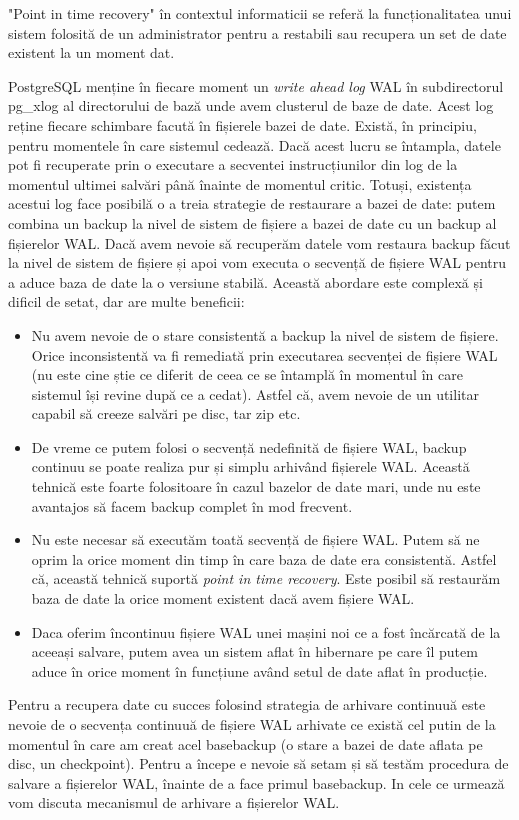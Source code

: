 "Point in time recovery" în contextul informaticii se referă la funcționalitatea unui sistem folosită de un administrator pentru a restabili sau recupera un set de date existent la un moment dat.
\par
PostgreSQL menține în fiecare moment un \textit{write ahead log} WAL în subdirectorul pg_xlog al directorului de bază unde avem clusterul de baze de date. Acest log reține fiecare schimbare facută în fișierele bazei de date. Există, în principiu, pentru momentele în care sistemul cedează. Dacă acest lucru se întampla, datele pot fi recuperate prin o executare a secventei instrucțiunilor din log de la momentul ultimei salvări până înainte de momentul critic. Totuși, existența acestui log face posibilă o a treia strategie de restaurare a bazei de date: putem combina un backup la nivel de sistem de fișiere a bazei de date cu un backup al fișierelor WAL. Dacă avem nevoie să recuperăm datele vom restaura backup făcut la nivel de sistem de fișiere și apoi vom executa o secvență de fișiere WAL pentru a aduce baza de date la o versiune stabilă. Această abordare este complexă și dificil de setat, dar are multe beneficii:
\begin{itemize}
\item Nu avem nevoie de o stare consistentă a backup la nivel de sistem de fișiere. Orice inconsistentă va fi remediată prin executarea secvenței de fișiere WAL (nu este cine știe ce diferit de ceea ce se întamplă în momentul în care sistemul își revine după ce a cedat). Astfel că, avem nevoie de un utilitar capabil să creeze salvări pe disc, tar zip etc.
\item De vreme ce putem folosi o secvență nedefinită de fișiere WAL, backup continuu se poate realiza pur și simplu arhivând fișierele WAL. Această tehnică este foarte folositoare în cazul bazelor de date mari, unde nu este avantajos să facem backup complet în mod frecvent.
\item Nu este necesar să executăm toată secvență de fișiere WAL. Putem să ne oprim la orice moment din timp în care baza de date era consistentă. Astfel că, această tehnică suportă \textit{point in time recovery}. Este posibil să restaurăm baza de date la orice moment existent dacă avem fișiere WAL.
\item Daca oferim încontinuu fișiere WAL unei mașini noi ce a fost încărcată de la aceeași salvare, putem avea un sistem aflat în hibernare pe care îl putem aduce în orice moment în funcțiune având setul de date aflat în producție.
\end{itemize}
Pentru a recupera date cu succes folosind strategia de arhivare continuuă este nevoie de o secvența continuuă de fișiere WAL arhivate ce există cel putin de la momentul în care am creat acel basebackup (o stare a bazei de date aflata pe disc, un checkpoint). Pentru a începe e nevoie să setam și să testăm procedura de salvare a fișierelor WAL, înainte de a face primul basebackup. In cele ce urmează vom discuta mecanismul de arhivare a fișierelor WAL.
